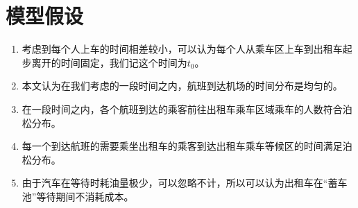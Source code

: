 \documentclass{cumcm}
\begin{document}
\section{模型假设}
\begin{enumerate}
	\item 考虑到每个人上车的时间相差较小，可以认为每个人从乘车区上车到出租车起步离开的时间固定，我们记这个时间为$t_0$。
	\item 本文认为在我们考虑的一段时间之内，航班到达机场的时间分布是均匀的。
	\item 在一段时间之内，各个航班到达的乘客前往出租车乘车区域乘车的人数符合泊松分布。
	\item 每一个到达航班的需要乘坐出租车的乘客到达出租车乘车等候区的时间满足泊松分布。
	\item 由于汽车在等待时耗油量极少，可以忽略不计，所以可以认为出租车在“蓄车池”等待期间不消耗成本。
\end{enumerate}

\newcommand{\flightnum}{$N_f$}
\newcommand{\taxinum}{$N_c$}
\newcommand{\waittime}{$t_w$}
\end{document}
